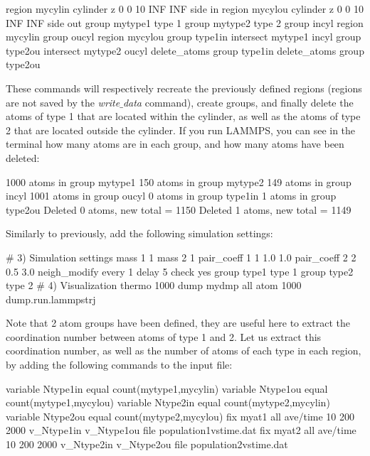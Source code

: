 \begin{lcverbatim}
region mycylin cylinder z 0 0 10 INF INF side in
region mycylou cylinder z 0 0 10 INF INF side out
group mytype1 type 1
group mytype2 type 2
group incyl region mycylin
group oucyl region mycylou
group type1in intersect mytype1 incyl
group type2ou intersect mytype2 oucyl
delete_atoms group type1in
delete_atoms group type2ou
\end{lcverbatim}

\noindent These commands will respectively recreate
the previously defined regions (regions are not saved by the
\textit{write$\_$data} command), create groups, and finally delete the
atoms of type 1 that are located within the cylinder, as
well as the atoms of type 2 that are located outside the
cylinder. If you run LAMMPS, you can see in the terminal how
many atoms are in each group, and how many atoms have been
deleted:

\begin{lcverbatim}
1000 atoms in group mytype1
150 atoms in group mytype2
149 atoms in group incyl
1001 atoms in group oucyl
0 atoms in group type1in
1 atoms in group type2ou
Deleted 0 atoms, new total = 1150
Deleted 1 atoms, new total = 1149
\end{lcverbatim}

\noindent Similarly to previously, add the following simulation
settings:

\begin{lcverbatim}
# 3) Simulation settings
mass 1 1
mass 2 1
pair_coeff 1 1 1.0 1.0
pair_coeff 2 2 0.5 3.0
neigh_modify every 1 delay 5 check yes
group type1 type 1
group type2 type 2
# 4) Visualization
thermo 1000
dump mydmp all atom 1000 dump.run.lammpstrj
\end{lcverbatim}

\noindent Note that 2 atom groups have been defined, they are useful
here to extract the coordination number between atoms of
type 1 and 2. Let us extract this coordination number, as
well as the number of atoms of each type in each region, by
adding the following commands to the input file:

\begin{lcverbatim}
variable Ntype1in equal count(mytype1,mycylin)
variable Ntype1ou equal count(mytype1,mycylou)
variable Ntype2in equal count(mytype2,mycylin)
variable Ntype2ou equal count(mytype2,mycylou)
fix myat1 all ave/time 10 200 2000 v_Ntype1in v_Ntype1ou file population1vstime.dat
fix myat2 all ave/time 10 200 2000 v_Ntype2in v_Ntype2ou file population2vstime.dat
\end{lcverbatim}

